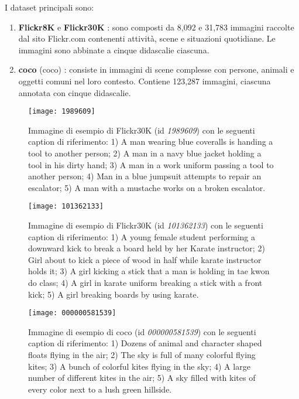 I dataset principali sono:
\begin{enumerate} 
\item \textbf{Flickr8K} \cite{hodosh2013framing} e \textbf{Flickr30K} \cite{young2014image}: sono composti da 8,092 e 31,783 immagini raccolte dal sito Flickr.com contenenti attività, scene e situazioni quotidiane. Le immagini sono abbinate a cinque didascalie ciascuna.
\item \textbf{\acrshort{coco}} (\acrlong{coco}) \cite{lin2014microsoft}: consiste in immagini di scene complesse con persone, animali e oggetti comuni nel loro contesto. Contiene 123,287 immagini, ciascuna annotata con cinque didascalie.
\end{enumerate}

\begin{figure}[H]
\centering
\texttt{[image: 1989609]}
\caption{Immagine di esempio di Flickr30K (id \textit{1989609}) con le seguenti caption di riferimento: 
1) A man wearing blue coveralls is handing a tool to another person;
2) A man in a navy blue jacket holding a tool in his dirty hand;
3) A man in a work uniform passing a tool to another person;
4) Man in a blue jumpsuit attempts to repair an escalator;
5) A man with a mustache works on a broken escalator.
}
\end{figure}

\begin{figure}[ht]
\centering
\texttt{[image: 101362133]}
\caption{Immagine di esempio di Flickr30K (id \textit{101362133}) con le seguenti caption di riferimento: 
1) A young female student performing a downward kick to break a board held by her Karate instructor; 
2) Girl about to kick a piece of wood in half while karate instructor holds it; 
3) A girl kicking a stick that a man is holding in tae kwon do class; 
4) A girl in karate uniform breaking a stick with a front kick; 
5) A girl breaking boards by using karate. 
}
\end{figure}

\begin{figure}[H]
\centering
\texttt{[image: 000000581539]}
\caption{Immagine di esempio di \acrshort{coco} (id \textit{000000581539}) con le seguenti caption di riferimento: 
1) Dozens of animal and character shaped floats flying in the air;
2) The sky is full of many colorful flying kites;
3) A bunch of colorful kites flying in the sky;
4) A large number of different kites in the air;
5) A sky filled with kites of every color next to a lush green hillside.
}
\end{figure}


